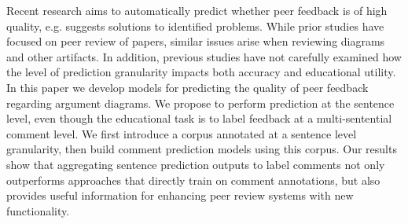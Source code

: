 Recent research aims to automatically predict whether peer feedback is of high quality, e.g.  suggests solutions to identified problems. While prior studies have focused on peer review of papers, similar issues arise when reviewing diagrams and other artifacts. In addition, previous studies have not carefully examined how the level of prediction granularity impacts both accuracy and educational utility. In this paper we develop models for predicting the quality of peer feedback regarding argument diagrams. We propose to perform prediction at the sentence level, even though the educational task is to label feedback at a multi-sentential comment level. We first introduce a corpus annotated at a sentence level granularity, then build comment prediction models using this corpus. Our results show that  aggregating sentence prediction outputs to label comments not only outperforms approaches that directly train on comment annotations, but also provides useful information for enhancing peer review systems with new functionality.
